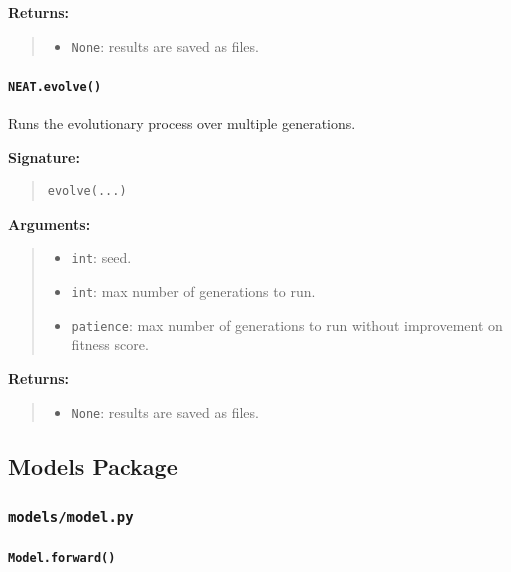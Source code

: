 \documentclass[11pt]{article}
\begin{document}
\textbf{Returns:}
\begin{quote}
\begin{itemize}
    \item \texttt{None}: results are saved as files.
\end{itemize}
\end{quote}


\paragraph{\texttt{NEAT.evolve()}}

Runs the evolutionary process over multiple generations.

\textbf{Signature:}
\begin{quote}
\begin{verbatim}
evolve(...)
\end{verbatim}
\end{quote}

\textbf{Arguments:}
\begin{quote}
\begin{itemize}
    \item \texttt{int}: seed.
    \item \texttt{int}: max number of generations to run.
    \item \texttt{patience}: max number of generations to run without improvement on fitness score.
\end{itemize}
\end{quote}

\textbf{Returns:}
\begin{quote}
\begin{itemize}
    \item \texttt{None}: results are saved as files.
\end{itemize}
\end{quote}

\subsection{Models Package}

\subsubsection{\texttt{models/model.py}}

\paragraph{\texttt{Model.forward()}}
\end{document}
